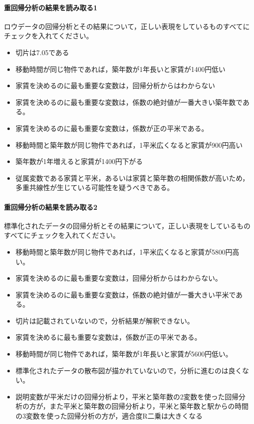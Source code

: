 \documentclass{ltjbook}
\begin{document}
\paragraph{重回帰分析の結果を読み取る1}ロウデータの回帰分析とその結果について，正しい表現をしているものすべてにチェックを入れてください。
\begin{itemize}
	\item 切片は7.05である
	\item 移動時間が同じ物件であれば，築年数が1年長いと家賃が1400円低い
	\item 家賃を決めるのに最も重要な変数は，回帰分析からはわからない
	\item 家賃を決めるのに最も重要な変数は，係数の絶対値が一番大きい築年数である。
	\item 家賃を決めるのに最も重要な変数は，係数が正の平米である。
	\item 移動時間と築年数が同じ物件であれば，1平米広くなると家賃が900円高い
	\item 築年数が1年増えると家賃が1400円下がる
	\item 従属変数である家賃と平米，あるいは家賃と築年数の相関係数が高いため，多重共線性が生じている可能性を疑うべきである。
\end{itemize}

\paragraph{重回帰分析の結果を読み取る2}標準化されたデータの回帰分析とその結果について，正しい表現をしているものすべてにチェックを入れてください。
\begin{itemize}
	\item 移動時間と築年数が同じ物件であれば，1平米広くなると家賃が5800円高い。
	\item 家賃を決めるのに最も重要な変数は，回帰分析からはわからない。
	\item 家賃を決めるのに最も重要な変数は，係数の絶対値が一番大きい平米である。
	\item 切片は記載されていないので，分析結果が解釈できない。
	\item 家賃を決めるに最も重要な変数は，係数が正の平米である。
	\item 移動時間が同じ物件であれば，築年数が1年長いと家賃が5600円低い。
	\item 標準化されたデータの散布図が描かれていないので，分析に進むのは良くない。
	\item 説明変数が平米だけの回帰分析より，平米と築年数の2変数を使った回帰分析の方が，また平米と築年数の回帰分析より，平米と築年数と駅からの時間の3変数を使った回帰分析の方が，適合度R二乗は大きくなる
\end{itemize}
\end{document}
